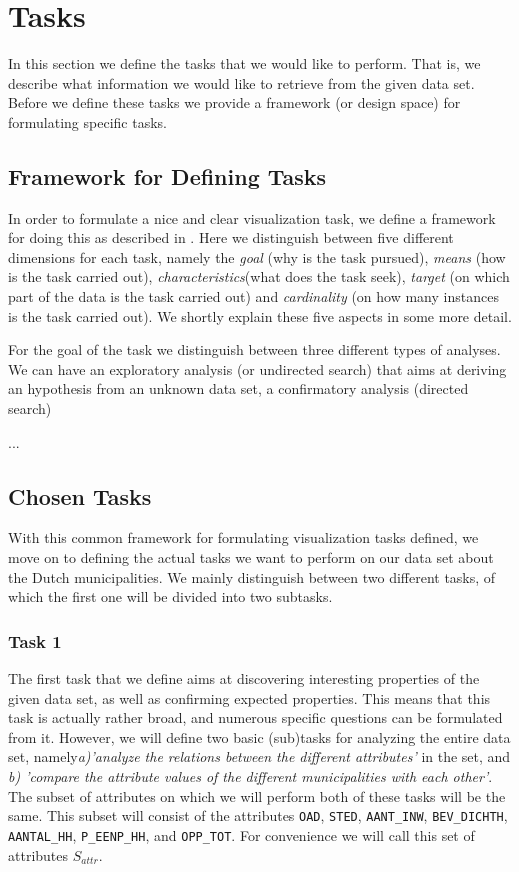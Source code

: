\section{Tasks}\label{sec:tasks}

In this section we define the tasks that we would like to perform. That is, we describe what information we would like to retrieve from the given data set. Before we define these tasks we provide a framework (or design space) for formulating specific tasks.

\subsection{Framework for Defining Tasks}
In order to formulate a nice and clear visualization task, we define a framework for doing this as described in \cite{schulz2013design}. Here we distinguish between five different dimensions for each task, namely the \textit{goal} (why is the task pursued), \textit{means} (how is the task carried out), \textit{characteristics}(what does the task seek), \textit{target} (on which part of the data is the task carried out) and \textit{cardinality} (on how many instances is the task carried out). We shortly explain these five aspects in some more detail.

For the goal of the task we distinguish between three different types of analyses. We can have an exploratory analysis (or undirected search) that aims at deriving an hypothesis from an unknown data set, a confirmatory analysis (directed search)

\todo{!}...

\subsection{Chosen Tasks}
With this common framework for formulating visualization tasks defined, we move on to defining the actual tasks we want to perform on our data set about the Dutch municipalities. We mainly distinguish between two different tasks, of which the first one will be divided into two subtasks.

\subsubsection{Task 1}\label{sec:task1}
The first task that we define aims at discovering interesting properties of the given data set, as well as confirming expected properties. This means that this task is actually rather broad, and numerous specific questions can be formulated from it. However, we will define two basic (sub)tasks for analyzing the entire data set, namely\textit{a)'analyze the relations between the different attributes'} in the set, and \textit{b) 'compare the attribute values of the different municipalities with each other'}. The subset of attributes on which we will perform both of these tasks will be the same. This subset will consist of the attributes \texttt{OAD}, \texttt{STED}, \texttt{AANT\_INW}, \texttt{BEV\_DICHTH}, \texttt{AANTAL\_HH}, \texttt{P\_EENP\_HH}, and \texttt{OPP\_TOT}. For convenience we will call this set of attributes $S_{attr}$.

